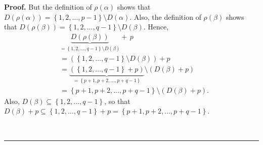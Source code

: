 \documentclass[numbers=enddot,12pt,final,onecolumn,notitlepage,abstracton]{scrartcl}%
\theoremstyle{definition}
\newenvironment{proof}[1][Proof]{\noindent\textbf{#1.} }{\ \rule{0.5em}{0.5em}}
\newenvironment{verlong}{}{}
\begin{document}
\begin{verlong}
\begin{proof}
But the definition of $\rho\left(  \alpha\right)  $ shows that $D\left(
\rho\left(  \alpha\right)  \right)  =\left\{  1,2,\ldots,p-1\right\}
\setminus D\left(  \alpha\right)  $. Also, the definition of $\rho\left(
\beta\right)  $ shows that $D\left(  \rho\left(  \beta\right)  \right)
=\left\{  1,2,\ldots,q-1\right\}  \setminus D\left(  \beta\right)  $. Hence,%
\begin{align*}
&  \underbrace{D\left(  \rho\left(  \beta\right)  \right)  }_{=\left\{
1,2,\ldots,q-1\right\}  \setminus D\left(  \beta\right)  }+\,p\\
&  =\left(  \left\{  1,2,\ldots,q-1\right\}  \setminus D\left(  \beta\right)
\right)  +p\\
&  =\underbrace{\left(  \left\{  1,2,\ldots,q-1\right\}  +p\right)
}_{=\left\{  p+1,p+2,\ldots,p+q-1\right\}  }\setminus\left(  D\left(
\beta\right)  +p\right) \\
&  =\left\{  p+1,p+2,\ldots,p+q-1\right\}  \setminus\left(  D\left(
\beta\right)  +p\right)  .
\end{align*}
Also, $D\left(  \beta\right)  \subseteq\left\{  1,2,\ldots,q-1\right\}  $, so
that $D\left(  \beta\right)  +p\subseteq\left\{  1,2,\ldots,q-1\right\}
+p=\left\{  p+1,p+2,\ldots,p+q-1\right\}  $.


\end{proof}
\end{verlong}
\end{document}

